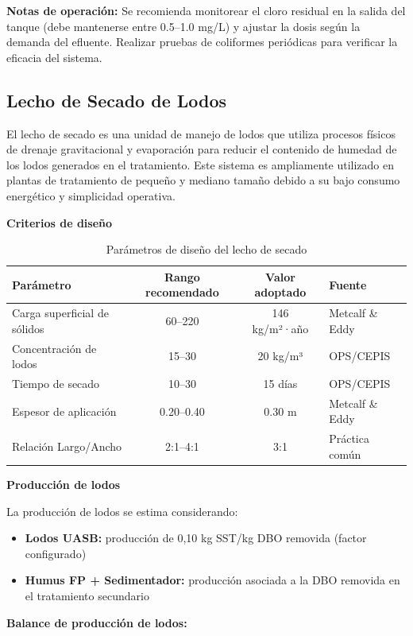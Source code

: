 \documentclass[12pt,a4paper]{article}
\begin{document}
\textbf{Notas de operación:} Se recomienda monitorear el cloro residual en la salida del tanque (debe mantenerse entre 0.5--1.0 mg/L) y ajustar la dosis según la demanda del efluente. Realizar pruebas de coliformes periódicas para verificar la eficacia del sistema.

\subsection{Lecho de Secado de Lodos}

El lecho de secado es una unidad de manejo de lodos que utiliza procesos físicos de drenaje gravitacional y evaporación para reducir el contenido de humedad de los lodos generados en el tratamiento. Este sistema es ampliamente utilizado en plantas de tratamiento de pequeño y mediano tamaño debido a su bajo consumo energético y simplicidad operativa.

\textbf{Criterios de diseño}

\begin{table}[H]
\centering
\caption{Parámetros de diseño del lecho de secado}
\small
\begin{tabular}{lccl}
\toprule
Parámetro & Rango recomendado & Valor adoptado & Fuente \\
\midrule
Carga superficial de sólidos & 60--220 & 146 kg/m²·año & Metcalf \& Eddy \cite{metcalf2014} \\
Concentración de lodos & 15--30 & 20 kg/m³ & OPS/CEPIS \cite{ops2005} \\
Tiempo de secado & 10--30 & 15 días & OPS/CEPIS \\
Espesor de aplicación & 0.20--0.40 & 0.30 m & Metcalf \& Eddy \\
Relación Largo/Ancho & 2:1--4:1 & 3:1 & Práctica común \\
\bottomrule
\end{tabular}
\end{table}

\textbf{Producción de lodos}

La producción de lodos se estima considerando:
\begin{itemize}[noitemsep,leftmargin=2em]
    \item \textbf{Lodos UASB:} producción de 0,10 kg SST/kg DBO removida (factor configurado)
    \item \textbf{Humus FP + Sedimentador:} producción asociada a la DBO removida en el tratamiento secundario
\end{itemize}

\textbf{Balance de producción de lodos:}
\end{document}
